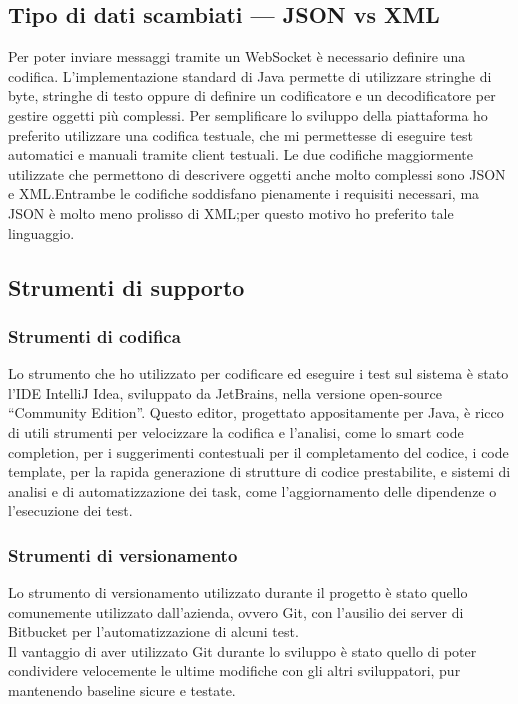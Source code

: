 	\subsection{Tipo di dati scambiati --- JSON vs XML}
	Per poter inviare messaggi tramite un WebSocket è necessario definire una codifica. L'implementazione standard di Java permette di utilizzare stringhe di byte, stringhe di testo oppure di definire un codificatore e un decodificatore per gestire oggetti più complessi. Per semplificare lo sviluppo della piattaforma ho preferito utilizzare una codifica testuale, che mi permettesse di eseguire test automatici e manuali tramite client testuali. Le due codifiche maggiormente utilizzate che permettono di descrivere oggetti anche molto complessi sono JSON e XML.\@ Entrambe le codifiche soddisfano pienamente i requisiti necessari, ma JSON è molto meno prolisso di XML;\@ per questo motivo ho preferito tale linguaggio.

	\subsection{Strumenti di supporto}
		\subsubsection{Strumenti di codifica}
		Lo strumento che ho utilizzato per codificare ed eseguire i test sul sistema è stato l'IDE IntelliJ Idea, sviluppato da JetBrains, nella versione open-source ``Community Edition''. Questo editor, progettato appositamente per Java, è ricco di utili strumenti per velocizzare la codifica e l'analisi, come lo smart code completion, per i suggerimenti contestuali per il completamento del codice, i code template, per la rapida generazione di strutture di codice prestabilite, e sistemi di analisi e di automatizzazione dei task, come l'aggiornamento delle dipendenze o l'esecuzione dei test.

		\subsubsection{Strumenti di versionamento}
		Lo strumento di versionamento utilizzato durante il progetto è stato quello comunemente utilizzato dall'azienda, ovvero Git, con l'ausilio dei server di Bitbucket per l'automatizzazione di alcuni test.
		\\
		Il vantaggio di aver utilizzato Git durante lo sviluppo è stato quello di poter condividere velocemente le ultime modifiche con gli altri sviluppatori, pur mantenendo baseline sicure e testate.
		
